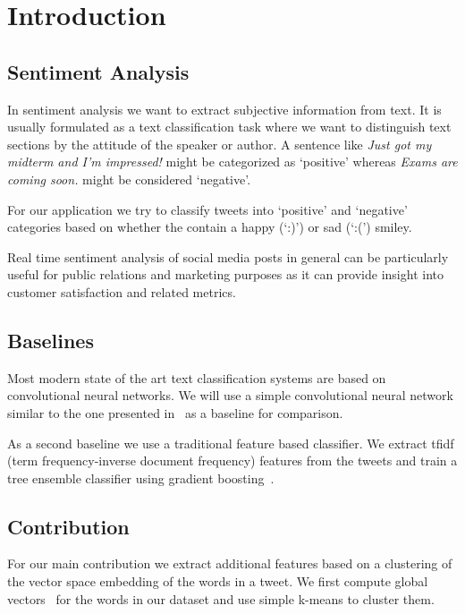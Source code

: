 
\section{Introduction}

\subsection{Sentiment Analysis}

In sentiment analysis we want to extract subjective information from text. It is
usually formulated as a text classification task where we want to distinguish
text sections by the attitude of the speaker or author. A sentence like
\textit{Just got my midterm and I'm impressed!} might be categorized as `positive'
whereas \textit{Exams are coming soon.} might be considered `negative'.

For our application we try to classify tweets into `positive' and `negative'
categories based on whether the contain a happy (`:)') or sad (`:(') smiley.

Real time sentiment analysis of social media posts in general can be particularly
useful for public relations and marketing purposes as it can provide insight into
customer satisfaction and related metrics.

\subsection{Baselines}

Most modern state of the art text classification systems are based on convolutional
neural networks. We will use a simple convolutional neural network similar to
the one presented in~\cite{cnn14} as a baseline for comparison.

As a second baseline we use a traditional feature based classifier. We extract
tfidf (term frequency-inverse document frequency) features from the tweets
and train a tree ensemble classifier using gradient boosting~\cite{gradBoost}.

\subsection{Contribution}

For our main contribution we extract additional features based on a clustering
of the vector space embedding of the words in a tweet. We first compute global
vectors~\cite{glove} for the words in our dataset and use simple k-means to cluster them.  
